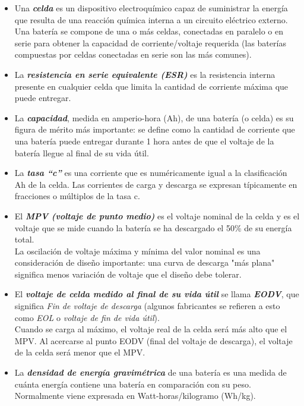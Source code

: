 \documentclass[12pt]{article}
\begin{document}
	\begin{itemize}
		\item  Una \textit{\textbf{celda}} es un dispositivo electroquímico capaz de suministrar la energía que resulta de una reacción química interna a un circuito eléctrico externo. \\
		Una batería se compone de una o más celdas, conectadas en paralelo o en serie para obtener la capacidad de corriente/voltaje requerida (las baterías compuestas por celdas conectadas en serie son las más comunes).
		\item La \textit{\textbf{resistencia en serie equivalente (ESR)}} es la resistencia interna presente en cualquier celda que limita la cantidad de corriente máxima que puede entregar.
		\item La \textit{\textbf{capacidad}}, medida en amperio-hora (Ah), de una batería (o celda) es su figura de mérito más importante: se define como la cantidad de corriente que una batería puede entregar durante 1 hora antes de que el voltaje de la batería llegue al final de su vida útil. 
 		\item La \textit{\textbf{tasa ``c''}}  es una corriente que es numéricamente igual a la clasificación Ah de la celda. Las corrientes de carga y descarga se expresan típicamente en fracciones o múltiplos de la tasa c. 
 		\item El \textit{\textbf{MPV (voltaje de punto medio)}} es el voltaje nominal de la celda y es el voltaje que se mide cuando la batería se ha descargado el 50\% de su energía total. \\
 		\noindent La oscilación de voltaje máxima y mínima del valor nominal es una consideración de diseño importante: una curva de descarga "más plana" significa menos variación de voltaje que el diseño debe tolerar.
 		\item El \textit{\textbf{voltaje de celda medido al final de su vida útil}} se llama \textit{\textbf{EODV}}, que significa \textit{Fin de voltaje de descarga} (algunos fabricantes se refieren a esto como \textit{EOL} o \textit{voltaje de fin de vida útil}). \\
 		\noindent Cuando se carga al máximo, el voltaje real de la celda será más alto que el MPV. Al acercarse al punto EODV (final del voltaje de descarga), el voltaje de la celda será menor que el MPV. 
 		\item La \textit{\textbf{densidad de energía gravimétrica}} de una batería es una medida de cuánta energía contiene una batería en comparación con su peso. Normalmente viene expresada en Watt-horas/kilogramo (Wh/kg).

\end{itemize}
\end{document}
